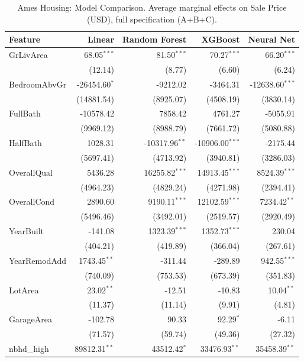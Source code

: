 \documentclass[12pt]{article}
\begin{document}
	\begin{table}[htbp]
		\centering
		\small
		\begin{threeparttable}
			\caption{Ames Housing: Model Comparison. Average marginal effects on Sale Price (USD), full specification (A+B+C).}
			\label{tab:ames_housing_model_comparison}
			\begin{tabular}{lrrrr}
				\toprule
				Feature & Linear & Random Forest & XGBoost & Neural Net \\
				\midrule
				GrLivArea & 68.05$^{***}$ & 81.50$^{***}$ & 70.27$^{***}$ & 66.20$^{***}$ \\
				& (12.14) & (8.77) & (6.60) & (6.24) \\
				BedroomAbvGr & -26454.60$^{*}$ & -9212.02 & -3464.31 & -12638.60$^{***}$ \\
				& (14881.54) & (8925.07) & (4508.19) & (3830.14) \\
				FullBath & -10578.42 & 7858.42 & 4761.27 & -5055.91 \\
				& (9969.12) & (8988.79) & (7661.72) & (5080.88) \\
				HalfBath & 1028.31 & -10317.96$^{**}$ & -10906.00$^{***}$ & -2175.44 \\
				& (5697.41) & (4713.92) & (3940.81) & (3286.03) \\
				\midrule
				OverallQual & 5436.28 & 16255.82$^{***}$ & 14913.45$^{***}$ & 8524.39$^{***}$ \\
				& (4964.23) & (4829.24) & (4271.98) & (2394.41) \\
				OverallCond & 2890.60 & 9190.11$^{***}$ & 12102.59$^{***}$ & 7234.42$^{**}$ \\
				& (5496.46) & (3492.01) & (2519.57) & (2920.49) \\
				YearBuilt & -141.08 & 1323.39$^{***}$ & 1352.73$^{***}$ & 230.04 \\
				& (404.21) & (419.89) & (366.04) & (267.61) \\
				YearRemodAdd & 1743.45$^{**}$ & -311.44 & -289.89 & 942.55$^{***}$ \\
				& (740.09) & (753.53) & (673.39) & (351.83) \\
				\midrule
				LotArea & 23.02$^{**}$ & -12.51 & -10.83 & 10.04$^{**}$ \\
				& (11.37) & (11.14) & (9.91) & (4.81) \\
				GarageArea & -102.78 & 90.33 & 92.29$^{*}$ & -6.11 \\
				& (71.57) & (59.74) & (49.36) & (27.32) \\
				nbhd\_high & 89812.31$^{**}$ & 43512.42$^{*}$ & 33476.93$^{**}$ & 35458.39$^{**}$ \\

\end{tabular}
\end{threeparttable}
\end{table}
\end{document}
